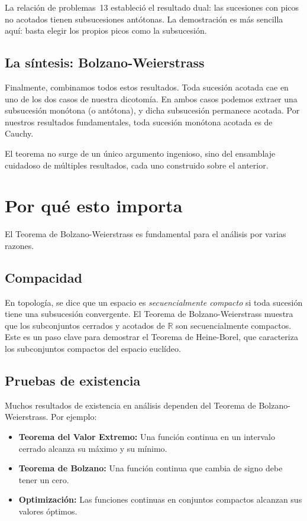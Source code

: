 La relación de problemas~13 estableció el resultado dual: las sucesiones
con picos no acotados tienen subsucesiones antótonas. La demostración es
más sencilla aquí: basta elegir los propios picos como la subsucesión.

\subsection{La síntesis: Bolzano-Weierstrass}

Finalmente, combinamos todos estos resultados. Toda sucesión acotada cae
en uno de los dos casos de nuestra dicotomía. En ambos casos podemos
extraer una subsucesión monótona (o antótona), y dicha subsucesión
permanece acotada. Por nuestros resultados fundamentales, toda sucesión
monótona acotada es de Cauchy.

El teorema no surge de un único argumento ingenioso, sino del ensamblaje
cuidadoso de múltiples resultados, cada uno construido sobre el anterior.

\section{Por qué esto importa}

El Teorema de Bolzano-Weierstrass es fundamental para el análisis por
varias razones.

\subsection{Compacidad}

En topología, se dice que un espacio es \emph{secuencialmente compacto}
si toda sucesión tiene una subsucesión convergente. El Teorema de
Bolzano-Weierstrass muestra que los subconjuntos cerrados y acotados de
$\mathbb{R}$ son secuencialmente compactos. Este es un paso clave para
demostrar el Teorema de Heine-Borel, que caracteriza los subconjuntos
compactos del espacio euclídeo.

\subsection{Pruebas de existencia}

Muchos resultados de existencia en análisis dependen del Teorema de
Bolzano-Weierstrass. Por ejemplo:

\begin{itemize}
  \item \textbf{Teorema del Valor Extremo:} Una función continua en un
        intervalo cerrado alcanza su máximo y su mínimo.
  \item \textbf{Teorema de Bolzano:} Una función continua que cambia de
        signo debe tener un cero.
  \item \textbf{Optimización:} Las funciones continuas en conjuntos
        compactos alcanzan sus valores óptimos.
\end{itemize}

